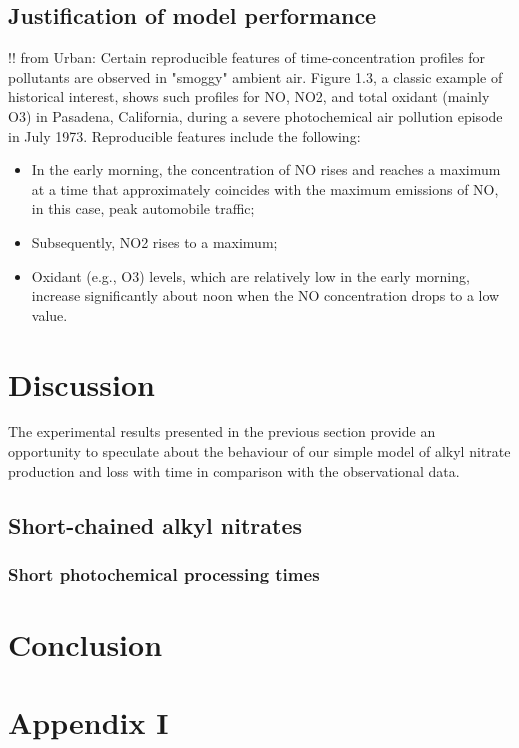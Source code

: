 \documentclass[11pt,a4paper]{article}
\begin{document}
\subsection{Justification of model performance}
!! from \citep{Finlayson-Pitts2000}
Urban:
Certain reproducible features of time-concentration profiles for  pollutants are observed in "smoggy" ambient air. Figure 1.3, a classic example of historical interest, shows such profiles for NO, NO2, and total oxidant (mainly O3) in Pasadena, California, during a  severe photochemical air pollution episode in July 1973.
Reproducible  features  include  the  following:
\begin{itemize}
\item In the early morning, the concentration of NO rises and  reaches a maximum at a time that approximately coincides with the  maximum emissions of NO, in this case, peak  automobile  traffic; 
\item Subsequently, NO2 rises to a maximum;
\item Oxidant (e.g., O3) levels, which are relatively low in the  early morning, increase significantly about noon when the NO concentration drops to a low value.
\end{itemize}

\section{Discussion} \label{sec:discuss}
The experimental results presented in the previous section provide an opportunity to speculate about the behaviour of our simple model of alkyl nitrate production and loss with time in comparison with the observational data. 

\subsection{Short-chained alkyl nitrates} \label{sec:short_an}
\subsubsection{Short photochemical processing times} \label{sec:short_an_short_time}

\section{Conclusion} \label{sec:conclusion}


\newpage
\clearpage
\thispagestyle{empty}%
\begin{landscape}%
\centering
\end{landscape}



\section{Appendix I} \label{sec:appendix1}
\end{document}
